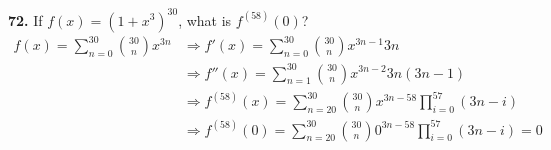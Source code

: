 \documentclass[a4paper,12pt]{article}
\begin{document}
\noindent\textbf{72. }If $f(x) = \left(1 + x^3\right)^{30}$, what is
$f^{(58)}(0)$?
\begin{align*}
  f(x) = \sum_{n=0}^{30}\binom{30}{n}x^{3n}
&\Longrightarrow f'(x) = \sum_{n=0}^{30}\binom{30}{n}x^{3n - 1}3n\\
&\Longrightarrow f''(x) = \sum_{n=1}^{30}\binom{30}{n}x^{3n - 2}3n(3n - 1)\\
&\Longrightarrow f^{(58)}(x) = \sum_{n=20}^{30}\binom{30}{n}x^{3n - 58}
                                               \prod_{i=0}^{57}(3n - i)\\
&\Longrightarrow f^{(58)}(0) = \sum_{n=20}^{30}\binom{30}{n}0^{3n - 58}
                                               \prod_{i=0}^{57}(3n - i) = 0
\end{align*}
\end{document}
